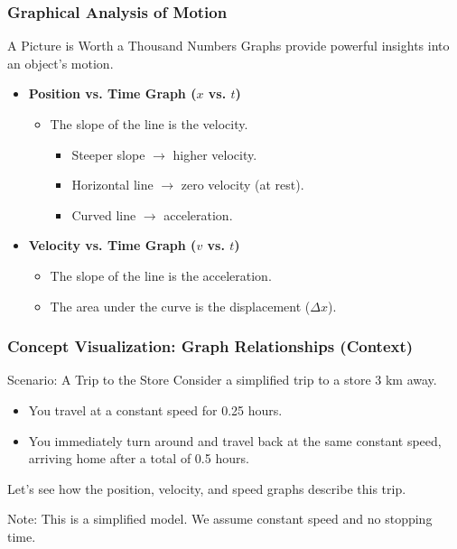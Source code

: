 \documentclass{beamer}
\begin{document}
\begin{frame}
\frametitle{Graphical Analysis of Motion}
\begin{block}{A Picture is Worth a Thousand Numbers}
Graphs provide powerful insights into an object's motion.
\end{block}
\begin{itemize}
    \item \textbf{Position vs. Time Graph ($x$ vs. $t$)}
    \begin{itemize}
        \item The \alert{slope} of the line is the \alert{velocity}.
        \begin{itemize}
            \item Steeper slope $\rightarrow$ higher velocity.
            \item Horizontal line $\rightarrow$ zero velocity (at rest).
            \item Curved line $\rightarrow$ acceleration.
        \end{itemize}
    \end{itemize}
    \vfill
    \item \textbf{Velocity vs. Time Graph ($v$ vs. $t$)}
    \begin{itemize}
        \item The \alert{slope} of the line is the \alert{acceleration}.
        \item The \alert{area under the curve} is the \alert{displacement ($\Delta x$)}.
    \end{itemize}
\end{itemize}
\end{frame}

\begin{frame}
\frametitle{Concept Visualization: Graph Relationships (Context)}
\begin{block}{Scenario: A Trip to the Store}
Consider a simplified trip to a store 3 km away.
\begin{itemize}
    \item You travel at a constant speed for 0.25 hours.
    \item You immediately turn around and travel back at the same constant speed, arriving home after a total of 0.5 hours.
\end{itemize}
Let's see how the position, velocity, and speed graphs describe this trip.
\end{block}
\alert{Note:} This is a simplified model. We assume constant speed and no stopping time.
\end{frame}
\end{document}
